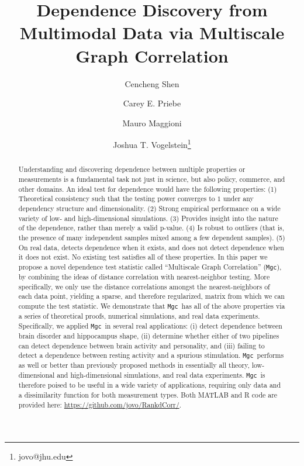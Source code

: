 \documentclass[11pt]{article}
\providecommand{\sct}[1]{{\sc \texttt{#1}}}
\newcommand{\Mgc}{\sct{Mgc}}
\newcommand{\website}{\url{https://github.com/jovo/RankdCorr/}}
\begin{document}
\def\spacingset#1{\renewcommand{\baselinestretch}%
{#1}\small\normalsize} \spacingset{1}

\title{\bf Dependence Discovery from Multimodal Data via  Multiscale Graph Correlation}
\author[1]{Cencheng Shen} %
\author[2]{Carey E. Priebe}%
\author[3]{Mauro Maggioni}%
\author[4]{Joshua T. Vogelstein\thanks{jovo@jhu.edu}}
\maketitle
\pagestyle{empty}

\begin{abstract}
Understanding and discovering dependence between multiple properties or measurements is a fundamental task not just in science, but also policy, commerce, and other domains. 
An ideal test for dependence would have the following properties:
(1) Theoretical consistency such that the testing power converges to $1$ under any dependency structure and dimensionality. 
(2) Strong empirical performance on a wide variety of low- and high-dimensional simulations. 
(3) Provides insight into the nature of the dependence, rather than merely a valid p-value. 
(4) Is robust to outliers (that is, the presence of many independent samples mixed among a few dependent samples).
(5) On real data, detects dependence when it exists, and does not detect dependence when it does not exist. 
No existing test satisfies all of these properties. 
In this paper we propose a novel dependence test statistic called ``Multiscale Graph Correlation'' (\Mgc), by combining the ideas of distance correlation with nearest-neighbor testing.  
More specifically, we only use the distance correlations amongst the nearest-neighbors of each data point, yielding a sparse, and therefore regularized, matrix from which we can compute the test statistic.
We demonstrate that \Mgc~has all of the above properties via a series of theoretical proofs, numerical simulations, and real data experiments.  Specifically, we applied \Mgc~in several real applications: (i) detect dependence between brain disorder and hippocampus shape, (ii) determine whether either of two pipelines can detect dependence between brain activity and personality, and (iii) failing to detect a dependence between resting activity and a spurious stimulation.  \Mgc~performs as well or better than previously proposed methods in essentially all theory, low-dimensional and high-dimensional simulations, and real data experiments.  \Mgc~is therefore poised to be useful in a wide variety of applications, requiring only data and a dissimilarity function for both measurement types.  Both MATLAB and R code are provided here: \website. 
\end{abstract}
\end{document}
